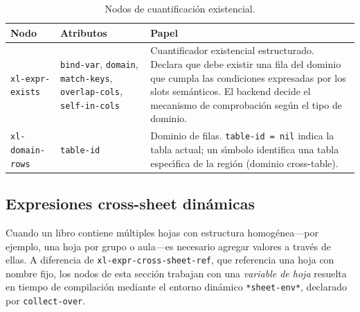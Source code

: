 \begin{table}[h!]
\centering
\caption{Nodos de cuantificaci\'on existencial.}
\label{tab:ast-cuantificacion}
\renewcommand{\arraystretch}{1.3}
\begin{tabular}{p{3.6cm} p{4.8cm} p{5.4cm}}
\toprule
\textbf{Nodo} & \textbf{Atributos} & \textbf{Papel} \\
\midrule
\texttt{xl-expr-exists}
  & \texttt{bind-var}, \texttt{domain},\newline
    \texttt{match-keys},\newline
    \texttt{overlap-cols},\newline
    \texttt{self-in-cols}
  & Cuantificador existencial estructurado.  Declara que debe
    existir una fila del dominio que cumpla las condiciones
    expresadas por los slots sem\'anticos.  El backend decide
    el mecanismo de comprobaci\'on seg\'un el tipo de dominio. \\
\midrule
\texttt{xl-domain-rows}
  & \texttt{table-id}
  & Dominio de filas.  \texttt{table-id = nil} indica la
    tabla actual; un s\'{\i}mbolo identifica una tabla
    espec\'{\i}fica de la regi\'on (dominio cross-table). \\
\bottomrule
\end{tabular}
\end{table}

\subsection{Expresiones cross-sheet din\'amicas}
\label{sec:ast-cross-sheet}

Cuando un libro contiene m\'ultiples hojas con estructura homog\'enea---por
ejemplo, una hoja por grupo o aula---es necesario agregar valores a trav\'es
de ellas.  A diferencia de \texttt{xl-expr-cross-sheet-ref}, que referencia
una hoja con nombre fijo, los nodos de esta secci\'on trabajan con una
\emph{variable de hoja} resuelta en tiempo de compilaci\'on mediante el
entorno din\'amico \texttt{*sheet-env*}, declarado por \texttt{collect-over}.

